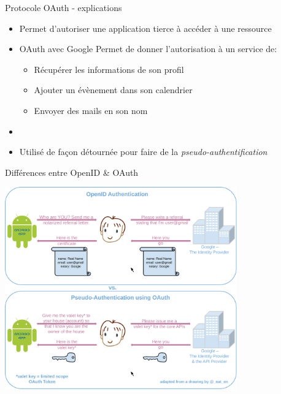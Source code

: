 \documentclass{beamer}
\begin{document}
\begin{frame}{Protocole OAuth - explications}
  \begin{center}
    \begin{itemize}
      \item Permet d'autoriser une application tierce à accéder à une ressource
      \pause
      \item[~]
      \begin{exampleblock}{OAuth avec Google}
        Permet de donner l'autorisation à un service de:
        \pause
        \begin{itemize}
          \item Récupérer les informations de son profil
          \pause
          \item Ajouter un évènement dans son calendrier
          \pause
          \item Envoyer des mails en son nom
        \end{itemize}
      \end{exampleblock}
      \pause
      \item[~]
      \item Utilisé de façon détournée pour faire de la \emph{pseudo-authentification}
    \end{itemize}
  \end{center}
\end{frame}

\begin{frame}{Différences entre OpenID \& OAuth}
  \begin{center}
    \includegraphics[width=0.75\textwidth]{img/OpenIDvsPseudo-AuthenticationusingOAuth}
  \end{center}
\end{frame}
\end{document}
